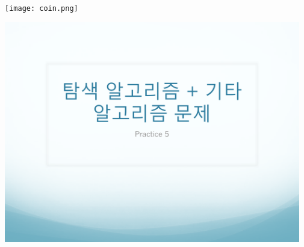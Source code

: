 \documentclass[12pt,a4paper]{article}
\begin{document}

\texttt{[image: coin.png]}

\includegraphics[page=5, width=0.97\textwidth]{1.pdf}
\end{document}
